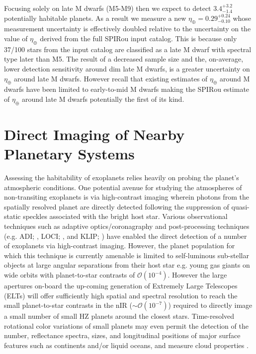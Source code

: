 Focusing solely on late M dwarfs (M5-M9) then we expect to detect
$3.4^{+3.2}_{-1.4}$ potentially habitable planets. As a result we measure a new 
$\eta_{\oplus}=0.29^{+0.24}_{-0.10}$ whose measurement uncertainty is effectively doubled 
relative to the uncertainty on the value of $\eta_{\oplus}$ derived from the full SPIRou input
catalog. This is because only 37/100 stars from the input catalog are
classified as a late M dwarf with spectral type later than M5. The result of a decreased sample size and the,
on-average, lower detection sensitivity around dim late M dwarfs, is a greater uncertainty
on $\eta_{\oplus}$ around late M dwarfs. However recall that existing estimates of $\eta_{\oplus}$
around M dwarfs have been limited to early-to-mid M dwarfs making the SPIRou estimate of
$\eta_{\oplus}$ around late M dwarfs potentially the first of its kind.


\section{Direct Imaging of Nearby Planetary Systems} \label{BSsect:imaging}
Assessing the habitability of exoplanets relies heavily on probing the planet's atmospheric
conditions. One potential avenue for studying the atmospheres of non-transiting exoplanets is
via high-contrast imaging
wherein photons from the spatially resolved planet are directly detected following the suppression
of quasi-static speckles associated with the bright host star. Various observational techniques such as
adaptive optics/coronagraphy and post-processing techniques (e.g. ADI; \citealt{marois06},
LOCI; \citealt{lafreniere07a}, and KLIP; \citealt{soummer12})
have enabled the direct detection of a number of exoplanets via high-contrast imaging.
However, the planet population for which this technique is currently amenable is limited to self-luminous
sub-stellar objects at large angular separations from their host star e.g. young gas giants on wide orbits with
planet-to-star contrasts of $\mathcal{O}(10^{-4})$.
However the large apertures on-board the up-coming generation of Extremely Large Telescopes (ELTs)
will offer sufficiently high spatial and spectral resolution to reach
the small planet-to-star contrasts in the nIR ($\sim \mathcal{O}(10^{-7})$) required to directly image
a small number of small HZ planets around the closest stars.
Time-resolved rotational color variations of small planets may even permit 
the detection of the number, reflectance spectra, sizes, and longitudinal positions of major surface
features such as continents and/or liquid oceans, and measure cloud properties
\citep{ford01,fujii10,fujii11,cowan09,cowan13}. \\

